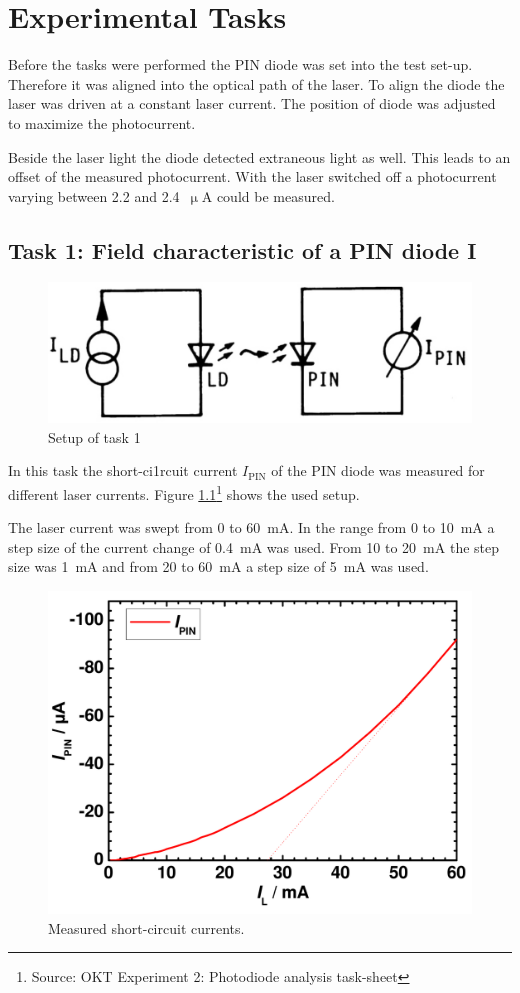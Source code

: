 \chapter{Experimental Tasks}

Before the tasks were performed the PIN diode was set into the test set-up. Therefore it was aligned into the optical path of the laser. To align the diode the laser was driven at a constant laser current. The position of diode was adjusted to maximize the photocurrent. 


Beside the laser light the diode detected extraneous light as well. This leads to an offset of the measured photocurrent. With the laser switched off a photocurrent varying between 2.2 and 2.4~$\upmu$A could be measured.

\section{Task 1: Field characteristic of a PIN diode I}
\label{T1}
\begin{figure}%
\centering
\includegraphics[width=.5\columnwidth]{Grafiken/T1_setup.jpg}%
\caption{Setup of task 1}%
\label{fig:T1_setup}%
\end{figure}
In this task the short-ci1rcuit current $I_{\mathrm{PIN}}$ of the PIN diode was measured for different laser currents. Figure \ref{fig:T1_setup}\footnote[3]{Source: OKT Experiment 2: Photodiode analysis task-sheet} shows the used setup. 

The laser current was swept from 0 to 60~mA. In the range from 0 to 10~mA a step size of the current change of 0.4~mA was used. From 10 to 20~mA the step size was 1~mA and from 20 to 60~mA a step size of 5~mA was used. 

\begin{figure}%
\centering
\includegraphics[width=.5\columnwidth]{Grafiken/T1_laser.pdf}%
\caption{Measured short-circuit currents.}%
\label{fig:T1_laser}%
\end{figure}

